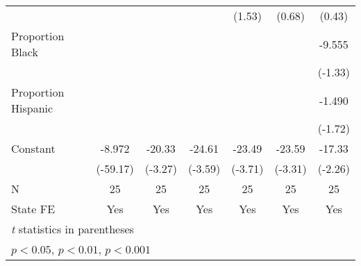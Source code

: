 {\begin{tabular}{l*{6}{c}}
                    &                     &                     &                     &      (1.53)         &      (0.68)         &      (0.43)         \\
\addlinespace
Proportion Black    &                     &                     &                     &                     &                     &      -9.555         \\
                    &                     &                     &                     &                     &                     &     (-1.33)         \\
\addlinespace
Proportion Hispanic &                     &                     &                     &                     &                     &      -1.490         \\
                    &                     &                     &                     &                     &                     &     (-1.72)         \\
\addlinespace
Constant            &      -8.972\sym{***}&      -20.33\sym{**} &      -24.61\sym{**} &      -23.49\sym{**} &      -23.59\sym{**} &      -17.33\sym{*}  \\
                    &    (-59.17)         &     (-3.27)         &     (-3.59)         &     (-3.71)         &     (-3.31)         &     (-2.26)         \\
\midrule
N                   &          25         &          25         &          25         &          25         &          25         &          25         \\
State FE            &         Yes         &         Yes         &         Yes         &         Yes         &         Yes         &         Yes         \\
\bottomrule
\multicolumn{7}{l}{\footnotesize \textit{t} statistics in parentheses}\\
\multicolumn{7}{l}{\footnotesize \sym{*} \(p<0.05\), \sym{**} \(p<0.01\), \sym{***} \(p<0.001\)}\\
\end{tabular}
}
